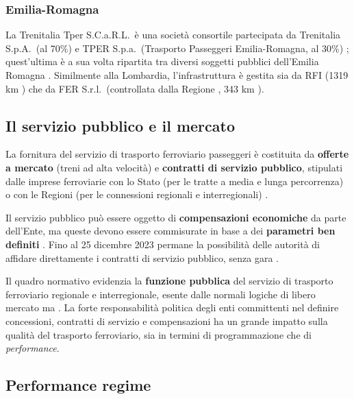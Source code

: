 \documentclass[12pt,a4paper,italian]{report}
\begin{document}
\subsubsection{Emilia-Romagna}

La Trenitalia Tper S.C.a.R.L.\ è una società consortile partecipata da
Trenitalia S.p.A.\ (al 70\%) e TPER S.p.a.\ (Trasporto Passeggeri
Emilia-Romagna, al 30\%) \cite{NascitaTper}; quest'ultima è a sua
volta ripartita tra diversi soggetti pubblici dell'Emilia Romagna
\cite{SociTper}.  Similmente alla Lombardia, l'infrastruttura è
gestita sia da RFI (1319 km \cite{RfiKm}) che da FER S.r.l.\
(controllata dalla Regione \cite{FerChiSiamo}, 343 km \cite{FerKm}).

\subsection{Il servizio pubblico e il mercato}
\label{servizio_pubblico}

La fornitura del servizio di trasporto ferroviario passeggeri è
costituita da \textbf{offerte a mercato} (treni ad alta velocità) e
\textbf{contratti di servizio pubblico}, stipulati dalle imprese
ferroviarie con lo Stato (per le tratte a media e lunga percorrenza) o
con le Regioni (per le connessioni regionali e interregionali)
\cite[vedi][paragrafo \textit{``Gli obblighi di servizio pubblico e i
    contratti di servizio''}]{CameraTrasportoFerroviario}.

Il servizio pubblico può essere oggetto di \textbf{compensazioni
    economiche} da parte dell'Ente, ma queste devono essere
commisurate in base a dei \textbf{parametri ben definiti} \cite[art.\
4, comma 1]{Reg1370}.  Fino al 25 dicembre 2023 permane la possibilità
delle autorità di affidare direttamente i contratti di servizio
pubblico, senza gara \cite[art.\ 8, comma 2, lettera iii)]{Reg1370}.

Il quadro normativo evidenzia la \textbf{funzione pubblica} del
servizio di trasporto ferroviario regionale e interregionale, esente
dalle normali logiche di libero mercato ma
.
La forte responsabilità politica degli enti committenti nel definire
concessioni, contratti di servizio e compensazioni ha un grande
impatto sulla qualità del trasporto ferroviario, sia in termini di
programmazione che di \textit{performance}.

\subsection{Performance regime}
\label{performance_regime}
\end{document}
